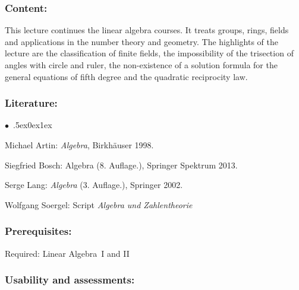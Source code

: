 \documentclass[a4paper,10pt]{article}
\renewenvironment{itemize}{\begin{list}{$\bullet$\ }{\itemsep.5ex\setlength{\topsep}{0.5\itemsep}\parsep0ex\labelsep1ex\settowidth{\labelwidth}{$\bullet$\ }\setlength{\leftmargin}{\labelwidth}\addtolength{\leftmargin}{3ex}\addtolength{\leftmargin}{\labelsep}}}{\end{list}}
\begin{document}
\subsubsection*{\large
    Content:
}
This lecture continues the linear algebra courses. It treats groups, rings, fields and applications in the number theory and geometry. The highlights of the lecture are the classification of finite fields, the impossibility of the trisection of angles with circle and ruler, the non-existence of a solution formula for the general equations of fifth degree and the quadratic reciprocity law.
\subsubsection*{\large
    Literature:
}
\begin{itemize}
\item Michael Artin: \emph{Algebra}, Birkhäuser 1998.
\item Siegfried Bosch: Algebra (8. Auf\/lage.), Springer Spektrum 2013.
\item Serge Lang: \emph{Algebra} (3. Auf\/lage.), Springer 2002.
\item Wolfgang Soergel: Script \emph{Algebra und Zahlentheorie}
\end{itemize}
\subsubsection*{\large
    Prerequisites:
}
Required: Linear Algebra~I and II
\cleardoublepage
\subsubsection*{\large
    Usability and assessments:
}
\end{document}
